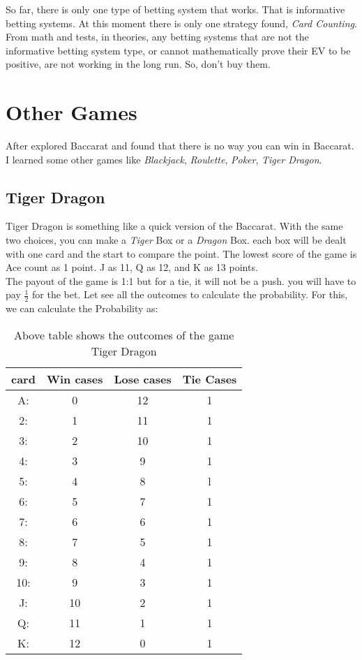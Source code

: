 \documentclass{article}
\begin{document}
So far, there is only one type of betting system that works.  That is informative betting systems.  At this moment there is only one strategy found, \emph{Card Counting}.\\

From math and tests, in theories, any betting systems that are not the informative betting system type, or cannot mathematically prove their EV to be positive, are not working in the long run.  So, don't buy them. \\

\clearpage
\section{Other Games}
After explored Baccarat and found that there is no way you can win in Baccarat.  I learned some other games like \emph{Blackjack}, \emph{Roulette}, \emph{Poker}, \emph{Tiger Dragon}.\\

\subsection{Tiger Dragon}
Tiger Dragon is something like a quick version of the Baccarat.  With the same two choices, you can make a \emph{Tiger} Box or a \emph{Dragon} Box.  each box will be dealt with one card and the start to compare the point.  The lowest score of the game is Ace count as 1 point. J as 11, Q as 12, and K as 13 points. \\

The payout of the game is 1:1 but for a tie, it will not be a push.  you will have to pay $\frac{1}{2}$ for the bet.  Let see all the outcomes to calculate the probability.  For this, we can calculate the Probability as:\\

\begin{table}[htb]
\centering
\begin{tabular}{|c|c|c|c|}
\hline
card & Win cases & Lose cases & Tie Cases\\
\hline
A:&	0&		12&	1\\
2:&	1&		11&	1\\
3:&	2&		10&	1\\
4:&	3&		9&		1\\
5:&	4&		8&		l\\
6:&	5&		7&		1\\
7:&	6&		6&		1\\
8:&	7&		5&		1\\
9:&	8&		4&		1\\
10:&9&		3&		1\\
J:&	10&	2&		1\\
Q:&	11&	1&		1\\
K:&	12&	0&		1\\
\hline
\end{tabular}
\caption{Above table shows the outcomes of the game Tiger Dragon}
\end{table}
\end{document}
